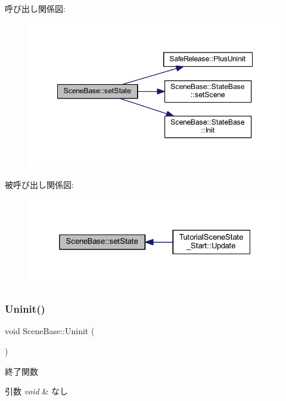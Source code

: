 呼び出し関係図\+:
\nopagebreak
\begin{figure}[H]
\begin{center}
\leavevmode
\includegraphics[width=348pt]{class_scene_base_a95d33774db6a05cf1e9da201720ea3db_cgraph}
\end{center}
\end{figure}
被呼び出し関係図\+:
\nopagebreak
\begin{figure}[H]
\begin{center}
\leavevmode
\includegraphics[width=325pt]{class_scene_base_a95d33774db6a05cf1e9da201720ea3db_icgraph}
\end{center}
\end{figure}
\mbox{\label{class_scene_base_aa4babf42cf2c2b6e17bb3ddd6ff13d31}} 
\subsubsection{\texorpdfstring{Uninit()}{Uninit()}}
{\footnotesize\ttfamily void Scene\+Base\+::\+Uninit (\begin{DoxyParamCaption}{ }\end{DoxyParamCaption})}



終了関数 


\begin{DoxyParams}{引数}
{\em void} & なし \\
\hline
\end{DoxyParams}

